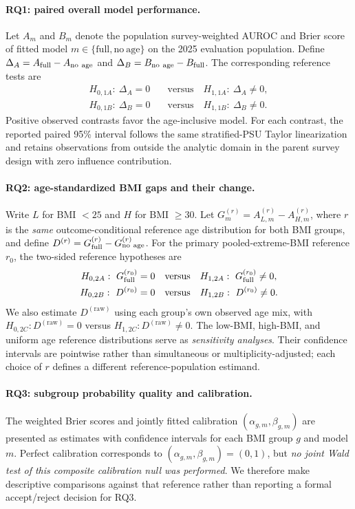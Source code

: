 \paragraph{RQ1: paired overall model performance.}
Let $A_m$ and $B_m$ denote the population survey-weighted AUROC and Brier score
of fitted model $m\in\{\mathrm{full},\mathrm{no\ age}\}$ on the 2025 evaluation
population. Define $\Delta_A=A_{\rm full}-A_{\rm no\ age}$ and
$\Delta_B=B_{\rm no\ age}-B_{\rm full}$. The corresponding reference tests are
\begin{align}
H_{0,1A}:\ \Delta_A=0 &\quad\text{versus}\quad H_{1,1A}:\ \Delta_A\neq0,\\
H_{0,1B}:\ \Delta_B=0 &\quad\text{versus}\quad H_{1,1B}:\ \Delta_B\neq0.
\end{align}
Positive observed contrasts favor the age-inclusive model. For each contrast,
the reported paired 95\% interval follows the same stratified-PSU Taylor
linearization and retains observations from outside the analytic domain in the
parent survey design with zero influence contribution.

\paragraph{RQ2: age-standardized BMI gaps and their change.}
Write $L$ for BMI $<25$ and $H$ for BMI $\geq30$. Let
$G_m^{(r)}=A_{L,m}^{(r)}-A_{H,m}^{(r)}$, where $r$ is the \emph{same}
outcome-conditional reference age distribution for both BMI groups, and define
$D^{(r)}=G_{\rm full}^{(r)}-G_{\rm no\ age}^{(r)}$. For the primary
pooled-extreme-BMI reference $r_0$, the two-sided reference hypotheses are
\begin{align}
H_{0,2A}:\ G_{\rm full}^{(r_0)}=0 &\quad\text{versus}\quad
 H_{1,2A}:\ G_{\rm full}^{(r_0)}\neq0,\\
H_{0,2B}:\ D^{(r_0)}=0 &\quad\text{versus}\quad
 H_{1,2B}:\ D^{(r_0)}\neq0.
\end{align}
We also estimate $D^{(\mathrm{raw})}$ using each group's own observed age mix,
with $H_{0,2C}:D^{(\mathrm{raw})}=0$ versus
$H_{1,2C}:D^{(\mathrm{raw})}\neq0$.
The low-BMI, high-BMI, and uniform age reference distributions serve as
\emph{sensitivity analyses}. Their confidence intervals are pointwise rather
than simultaneous or multiplicity-adjusted; each choice of $r$ defines a
different reference-population estimand.

\paragraph{RQ3: subgroup probability quality and calibration.}
The weighted Brier scores and jointly fitted calibration
$(\alpha_{g,m},\beta_{g,m})$ are presented as estimates with confidence intervals
for each BMI group $g$ and model $m$. Perfect calibration corresponds to
$(\alpha_{g,m},\beta_{g,m})=(0,1)$, but \emph{no joint Wald test of this
composite calibration null was performed}. We therefore make descriptive
comparisons against that reference rather than reporting a formal
accept/reject decision for RQ3.

